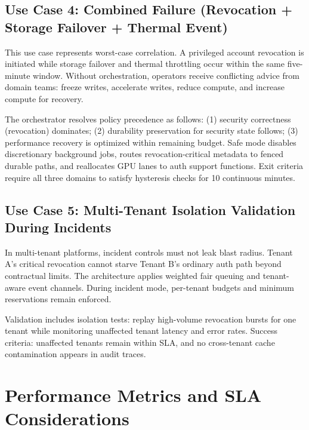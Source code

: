 \documentclass[12pt]{article}
\begin{document}
\subsection{Use Case 4: Combined Failure (Revocation + Storage Failover + Thermal Event)}
This use case represents worst-case correlation. A privileged account revocation is initiated while storage failover and thermal throttling occur within the same five-minute window. Without orchestration, operators receive conflicting advice from domain teams: freeze writes, accelerate writes, reduce compute, and increase compute for recovery.

The orchestrator resolves policy precedence as follows: (1) security correctness (revocation) dominates; (2) durability preservation for security state follows; (3) performance recovery is optimized within remaining budget. Safe mode disables discretionary background jobs, routes revocation-critical metadata to fenced durable paths, and reallocates GPU lanes to auth support functions. Exit criteria require all three domains to satisfy hysteresis checks for 10 continuous minutes.

\subsection{Use Case 5: Multi-Tenant Isolation Validation During Incidents}
In multi-tenant platforms, incident controls must not leak blast radius. Tenant A's critical revocation cannot starve Tenant B's ordinary auth path beyond contractual limits. The architecture applies weighted fair queuing and tenant-aware event channels. During incident mode, per-tenant budgets and minimum reservations remain enforced.

Validation includes isolation tests: replay high-volume revocation bursts for one tenant while monitoring unaffected tenant latency and error rates. Success criteria: unaffected tenants remain within SLA, and no cross-tenant cache contamination appears in audit traces.

\section{Performance Metrics and SLA Considerations}
\end{document}
